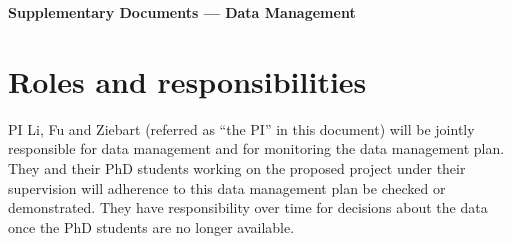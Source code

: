 \pagebreak

\begin{center}
	{\Large \bf Supplementary Documents --- Data Management}\\
\end{center}

\vspace{0.5em}
\section{Roles and responsibilities}\label{sec:resp}

PI Li, Fu and Ziebart (referred as “the PI” in this document) will be jointly responsible for data management and for monitoring the data management plan. They and their PhD students working on the proposed project under their supervision will adherence to this data management plan be checked or demonstrated. They have responsibility over time for decisions about the data once the PhD students are no longer available.


